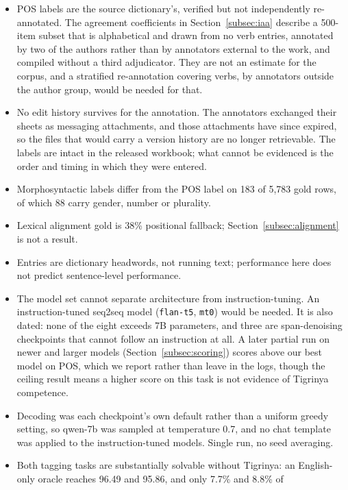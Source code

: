 \documentclass[11pt]{article}
\begin{document}
\begin{itemize}
  \item POS labels are the source dictionary's, verified but not
    independently re-annotated. The agreement coefficients in
    Section~\ref{subsec:iaa} describe a 500-item subset that is alphabetical
    and drawn from no verb entries, annotated by two of the authors rather
    than by annotators external to the work, and compiled without a third
    adjudicator. They are not an estimate for the corpus, and a
    stratified re-annotation covering verbs, by annotators outside the author
    group, would be needed for that.
  \item No edit history survives for the annotation. The annotators exchanged
    their sheets as messaging attachments, and those attachments have since
    expired, so the files that would carry a version history are no longer
    retrievable. The labels are intact in the released workbook; what cannot
    be evidenced is the order and timing in which they were entered.
  \item Morphosyntactic labels differ from the POS label on 183 of 5,783
    gold rows, of which 88 carry gender, number or plurality.
  \item Lexical alignment gold is 38\% positional fallback;
    Section~\ref{subsec:alignment} is not a result.
  \item Entries are dictionary headwords, not running text; performance here
    does not predict sentence-level performance.
  \item The model set cannot separate architecture from instruction-tuning. An
    instruction-tuned seq2seq model (\texttt{flan-t5}, \texttt{mt0}) would be
    needed. It is also dated: none of the eight exceeds 7B parameters, and
    three are span-denoising checkpoints that cannot follow an instruction at
    all. A later partial run on newer and larger models
    (Section~\ref{subsec:scoring}) scores above our best model on POS, which
    we report rather than leave in the logs, though the ceiling result means
    a higher score on this task is not evidence of Tigrinya competence.
  \item Decoding was each checkpoint's own default rather than a uniform
    greedy setting, so qwen-7b was sampled at temperature 0.7, and no chat
    template was applied to the instruction-tuned models. Single run, no
    seed averaging.
  \item Both tagging tasks are substantially solvable without Tigrinya: an
    English-only oracle reaches 96.49 and 95.86, and only 7.7\% and 8.8\% of

\end{itemize}
\end{document}

